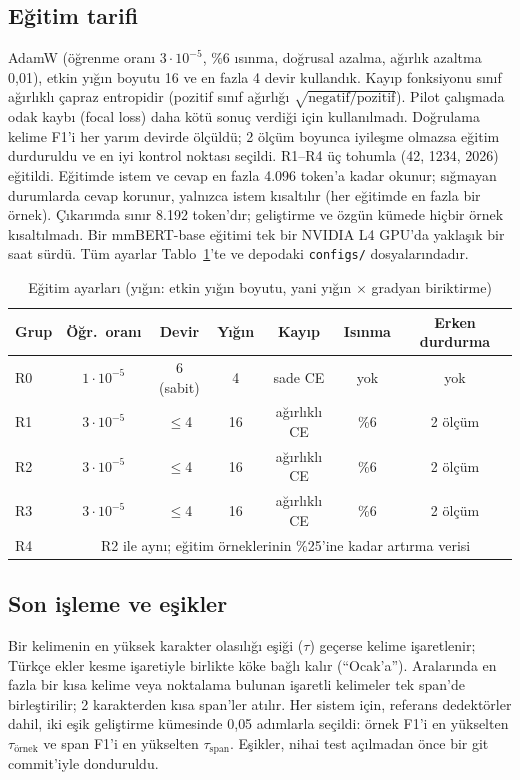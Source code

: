 \documentclass[conference,a4paper]{IEEEtran}
\begin{document}
\subsection{Eğitim tarifi}
AdamW (öğrenme oranı $3\cdot10^{-5}$, \%6 ısınma, doğrusal azalma, ağırlık azaltma 0{,}01), etkin yığın boyutu 16 ve en fazla 4 devir kullandık. Kayıp fonksiyonu sınıf ağırlıklı çapraz entropidir (pozitif sınıf ağırlığı $\sqrt{\text{negatif}/\text{pozitif}}$). Pilot çalışmada odak kaybı (focal loss) daha kötü sonuç verdiği için kullanılmadı. Doğrulama kelime F1'i her yarım devirde ölçüldü; 2 ölçüm boyunca iyileşme olmazsa eğitim durduruldu ve en iyi kontrol noktası seçildi. R1--R4 üç tohumla (42, 1234, 2026) eğitildi. Eğitimde istem ve cevap en fazla 4.096 token'a kadar okunur; sığmayan durumlarda cevap korunur, yalnızca istem kısaltılır (her eğitimde en fazla bir örnek). Çıkarımda sınır 8.192 token'dır; geliştirme ve özgün kümede hiçbir örnek kısaltılmadı. Bir mmBERT-base eğitimi tek bir NVIDIA L4 GPU'da yaklaşık bir saat sürdü. Tüm ayarlar Tablo~\ref{tab:hparams}'te ve depodaki \texttt{configs/} dosyalarındadır.

\begin{table}[t]
\centering
\caption{Eğitim ayarları (yığın: etkin yığın boyutu, yani yığın $\times$ gradyan biriktirme)}
\label{tab:hparams}
\scriptsize
\setlength{\tabcolsep}{3.5pt}
\begin{tabular}{@{}lcccccc@{}}
\toprule
Grup & Öğr.\ oranı & Devir & Yığın & Kayıp & Isınma & Erken durdurma \\
\midrule
R0 & $1\cdot10^{-5}$ & 6 (sabit) & 4 & sade CE & yok & yok \\
R1 & $3\cdot10^{-5}$ & $\leq$4 & 16 & ağırlıklı CE & \%6 & 2 ölçüm \\
R2 & $3\cdot10^{-5}$ & $\leq$4 & 16 & ağırlıklı CE & \%6 & 2 ölçüm \\
R3 & $3\cdot10^{-5}$ & $\leq$4 & 16 & ağırlıklı CE & \%6 & 2 ölçüm \\
R4 & \multicolumn{6}{c}{R2 ile aynı; eğitim örneklerinin \%25'ine kadar artırma verisi} \\
\bottomrule
\end{tabular}
\end{table}

\subsection{Son işleme ve eşikler}
Bir kelimenin en yüksek karakter olasılığı eşiği ($\tau$) geçerse kelime işaretlenir; Türkçe ekler kesme işaretiyle birlikte köke bağlı kalır (``Ocak'a''). Aralarında en fazla bir kısa kelime veya noktalama bulunan işaretli kelimeler tek span'de birleştirilir; 2 karakterden kısa span'ler atılır. Her sistem için, referans dedektörler dahil, iki eşik geliştirme kümesinde 0{,}05 adımlarla seçildi: örnek F1'i en yükselten $\tau_{\text{örnek}}$ ve span F1'i en yükselten $\tau_{\text{span}}$. Eşikler, nihai test açılmadan önce bir git commit'iyle donduruldu.
\end{document}
